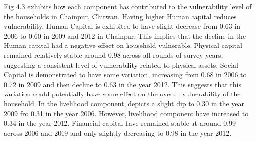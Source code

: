\vspace{-25pt}
Fig 4.3 exhibits how each component has contributed to the vulnerability level of the households in Chainpur, Chitwan. Having higher Human capital reduces vulnerability. Human Capital is exhibited to have slight decrease from 0.63 in 2006 to 0.60 in 2009 and 2012 in Chainpur. This implies that the decline in the Human capital had a negative effect on household vulnerable. Physical capital remained relatively stable around 0.98 across all rounds of survey years, suggesting a consistent level of vulnerability related to physical assets. Social Capital is demonstrated to have some variation, increasing from 0.68 in 2006 to 0.72 in 2009 and then decline to 0.63 in the year 2012. This suggests that this variation could potentially have some effect on the overall vulnerability of the household. In the livelihood component, depicts a slight dip to 0.30 in the year 2009 fro 0.31 in the year 2006. However, livelihood component have increased to 0.34 in the year 2012. Financial capital have remained stable at around 0.99 across 2006 and 2009 and only slightly decreasing to 0.98 in the year 2012. 

